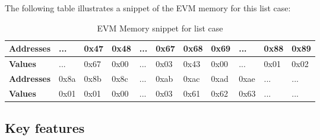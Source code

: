 The following table illustrates a snippet of the EVM memory for this list case:
\begin{table}[h!]
  \centering
  \renewcommand{\arraystretch}{1.2} %
  \begin{tabular}{|>{\centering\arraybackslash}m{3cm}|>{\centering\arraybackslash}m{1cm}|>{\centering\arraybackslash}m{1cm}|>{\centering\arraybackslash}m{1cm}|>{\centering\arraybackslash}m{1cm}|>{\centering\arraybackslash}m{1cm}|>{\centering\arraybackslash}m{1cm}|>{\centering\arraybackslash}m{1cm}|>{\centering\arraybackslash}m{1cm}|>{\centering\arraybackslash}m{1cm}|>{\centering\arraybackslash}m{1cm}|}
  \hline
  \textbf{Addresses} & ... & 0x47 & 0x48 & ... & 0x67 & 0x68 & 0x69 & ... & 0x88 & 0x89 \\ \hline
  \textbf{Values}    & ... & 0x67 & 0x00 & ... & 0x03 & 0x43 & 0x00 & ... & 0x01 & 0x02 \\ \hline \hline
  \textbf{Addresses} & 0x8a & 0x8b & 0x8c & ... & 0xab & 0xac & 0xad & 0xae & ... & ... \\ \hline
  \textbf{Values}    & 0x01 & 0x01 & 0x00 & ... & 0x03 & 0x61 & 0x62 & 0x63 & ... & ... \\ \hline
  \end{tabular}
  \caption{EVM Memory snippet for list case}
  \label{tab:evm_memory_aux} 
  \end{table}

\subsection{Key features}
\label{sec:key_features}

